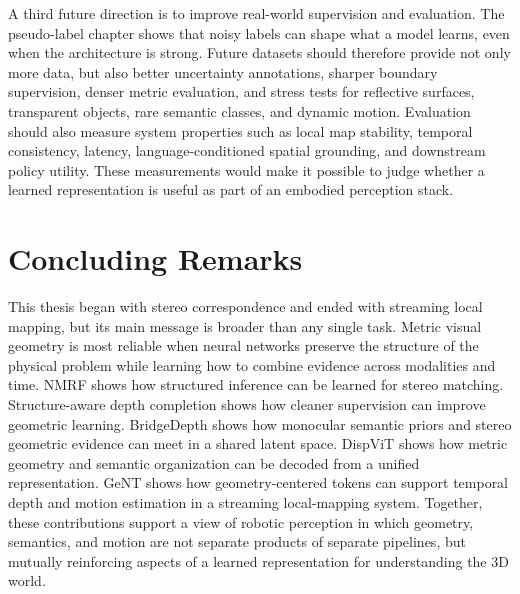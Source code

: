 A third future direction is to improve real-world supervision and evaluation.
The pseudo-label chapter shows that noisy labels can shape what a model learns, even when the architecture is strong.
Future datasets should therefore provide not only more data, but also better uncertainty annotations, sharper boundary supervision, denser metric evaluation, and stress tests for reflective surfaces, transparent objects, rare semantic classes, and dynamic motion.
Evaluation should also measure system properties such as local map stability, temporal consistency, latency, language-conditioned spatial grounding, and downstream policy utility.
These measurements would make it possible to judge whether a learned representation is useful as part of an embodied perception stack.

\section{Concluding Remarks}

This thesis began with stereo correspondence and ended with streaming local mapping, but its main message is broader than any single task.
Metric visual geometry is most reliable when neural networks preserve the structure of the physical problem while learning how to combine evidence across modalities and time.
NMRF shows how structured inference can be learned for stereo matching.
Structure-aware depth completion shows how cleaner supervision can improve geometric learning.
BridgeDepth shows how monocular semantic priors and stereo geometric evidence can meet in a shared latent space.
DispViT shows how metric geometry and semantic organization can be decoded from a unified representation.
GeNT shows how geometry-centered tokens can support temporal depth and motion estimation in a streaming local-mapping system.
Together, these contributions support a view of robotic perception in which geometry, semantics, and motion are not separate products of separate pipelines, but mutually reinforcing aspects of a learned representation for understanding the 3D world.
